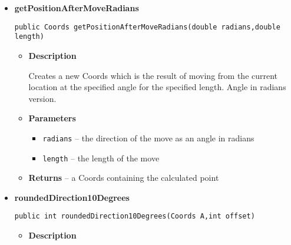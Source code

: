 \documentclass[11pt,a4paper]{report}
\begin{document}
{{{{{{{{{{{{{{{{{{\begin{itemize}
{\begin{itemize}
{Creates a new Coords which is the result of moving from the current location at the specified angle for the specified length. Angle in degrees version.
}
\item{
{\bf  Parameters}
  \begin{itemize}
   \item{
\texttt{degrees} -- the direction of the move as an angle in degrees}
   \item{
\texttt{length} -- the length of the move}
  \end{itemize}
}%
\item{{\bf  Returns} -- 
a Coords containing the calculated point 
}%
\end{itemize}
}%
\item{ 
\hypertarget{uk.ac.ed.inf.aqmaps.geometry.Coords.getPositionAfterMoveRadians(double, double)}{{\bf  getPositionAfterMoveRadians}\\}
\begin{lstlisting}[frame=none]
public Coords getPositionAfterMoveRadians(double radians,double length)\end{lstlisting} %
\begin{itemize}
\item{
{\bf  Description}

Creates a new Coords which is the result of moving from the current location at the specified angle for the specified length. Angle in radians version.
}
\item{
{\bf  Parameters}
  \begin{itemize}
   \item{
\texttt{radians} -- the direction of the move as an angle in radians}
   \item{
\texttt{length} -- the length of the move}
  \end{itemize}
}%
\item{{\bf  Returns} -- 
a Coords containing the calculated point 
}%
\end{itemize}
}%
\item{ 
\hypertarget{uk.ac.ed.inf.aqmaps.geometry.Coords.roundedDirection10Degrees(uk.ac.ed.inf.aqmaps.geometry.Coords, int)}{{\bf  roundedDirection10Degrees}\\}
\begin{lstlisting}[frame=none]
public int roundedDirection10Degrees(Coords A,int offset)\end{lstlisting} %
\begin{itemize}
\item{
{\bf  Description}

}
\end{itemize}}
\end{itemize}}}}}}}}}}}}}}}}}}}
\end{document}
